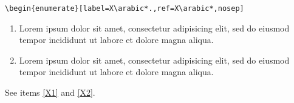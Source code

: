 \documentclass[12pt]{article}
\begin{document}
\begin{verbatim}
\begin{enumerate}[label=X\arabic*.,ref=X\arabic*,nosep]
\end{verbatim}
\begin{enumerate}[label=X\arabic*.,ref=X\arabic*,nosep]
\item\label{X1}
Lorem ipsum dolor sit amet, consectetur adipisicing elit, sed do
eiusmod tempor incididunt ut labore et dolore magna aliqua. 
\item\label{X2}
Lorem ipsum dolor sit amet, consectetur adipisicing elit, sed do
eiusmod tempor incididunt ut labore et dolore magna aliqua. 
\end{enumerate}

See items \ref{X1} and \ref{X2}.
\end{document}
